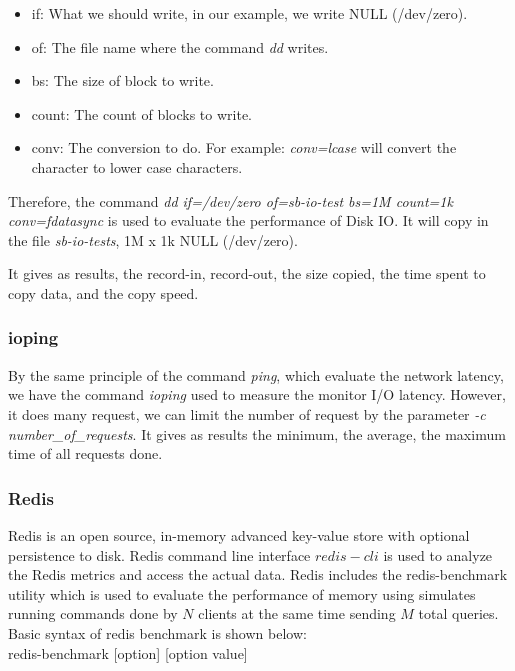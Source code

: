 \documentclass[10pt, conference]{IEEEtran}
\begin{document}
\begin{itemize}

\item if: What we should write, in our example, we write NULL (/dev/zero).
\item of: The file name where the command \textit{dd} writes.
\item bs: The size of block to write.
\item count: The count of blocks to write. 
\item conv: The conversion to do. For example: \textit{conv=lcase} will convert the character to lower case characters.

\end{itemize}

Therefore, the command \textit{dd if=/dev/zero of=sb-io-test bs=1M count=1k conv=fdatasync} is used to evaluate the performance of Disk IO. It will copy in the file \textit{sb-io-tests}, 1M x 1k NULL (/dev/zero).

It gives as results, the record-in, record-out, the size copied, the time spent to copy data, and the copy speed.

\subsubsection{ioping}

By the same principle of the command \textit{ping}, which evaluate the network latency, we have the command \textit{ioping} used to measure the monitor I/O latency. However, it does many request, we can limit the number of request by the parameter \textit{-c number\_of\_requests}. It gives as results the minimum, the average, the maximum time of all requests done.

\subsubsection{Redis}

\indent Redis is an open source, in-memory advanced key-value store with optional persistence to disk. Redis command line interface ${redis-cli}$ is used to analyze the Redis metrics and access the actual data. Redis includes the redis-benchmark utility which is used to evaluate the performance of memory using simulates running commands done by $N$ clients at the same time sending $M$ total queries. Basic syntax of redis benchmark is shown below:\\

\indent redis-benchmark [option] [option value]\\
\end{document}
